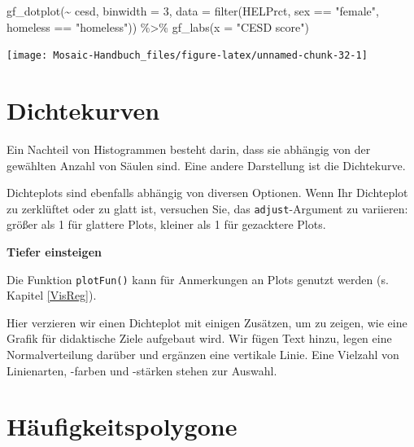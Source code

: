 \documentclass[
  ngerman,
]{scrbook}
\newenvironment{Shaded}{\begin{snugshade}}{\end{snugshade}}
\newcommand{\AttributeTok}[1]{\textcolor[rgb]{0.77,0.63,0.00}{#1}}
\newcommand{\DecValTok}[1]{\textcolor[rgb]{0.00,0.00,0.81}{#1}}
\newcommand{\FunctionTok}[1]{\textcolor[rgb]{0.00,0.00,0.00}{#1}}
\newcommand{\NormalTok}[1]{#1}
\newcommand{\SpecialCharTok}[1]{\textcolor[rgb]{0.00,0.00,0.00}{#1}}
\newcommand{\StringTok}[1]{\textcolor[rgb]{0.31,0.60,0.02}{#1}}
\newenvironment{tiefereinsteigen}[1]
  {
  \begin{itemize}
  \renewcommand{\labelitemi}{
    \raisebox{2.6\height}[0pt][0pt]{
      {\setkeys{Gin}{width=7em,keepaspectratio}
        {\normalsize \textcolor{dark-fom-green}\faSearch}}
        }
  }
  \begin{blackbox}
         \bgroup\color{dark-fom-green}
          {\textbf{Tiefer einsteigen}}
        \egroup
  \item
  }
  {
  \end{blackbox}
  \end{itemize}
  }
\newenvironment{note}[1]
  {
  \begin{itemize}
  \renewcommand{\labelitemi}{
    \raisebox{-.01\height}[0pt][0pt]{
      {\setkeys{Gin}{width=7em,keepaspectratio}
        {\normalsize \textcolor{dark-fom-green}\faHashtag}}
        }
  }
  \begin{blackbox}
   \item
    }
    {
  \end{blackbox}
  \end{itemize}
  }
\begin{document}
\begin{Shaded}
\begin{Highlighting}[]
\FunctionTok{gf\_dotplot}\NormalTok{(}\SpecialCharTok{\textasciitilde{}}\NormalTok{ cesd, }\AttributeTok{binwidth =} \DecValTok{3}\NormalTok{,}
\AttributeTok{data =} \FunctionTok{filter}\NormalTok{(HELPrct, sex }\SpecialCharTok{==} \StringTok{"female"}\NormalTok{, homeless }\SpecialCharTok{==} \StringTok{"homeless"}\NormalTok{)) }\SpecialCharTok{\%\textgreater{}\%}
\FunctionTok{gf\_labs}\NormalTok{(}\AttributeTok{x =} \StringTok{"CESD score"}\NormalTok{)}
\end{Highlighting}
\end{Shaded}

\begin{center}\texttt{[image: Mosaic-Handbuch\_files/figure-latex/unnamed-chunk-32-1]} \end{center}

\hypertarget{dichtekurven}{%
\section{Dichtekurven}\label{dichtekurven}}

Ein Nachteil von Histogrammen besteht darin, dass sie abhängig von der gewählten Anzahl von Säulen sind. Eine andere Darstellung ist die Dichtekurve.

\begin{note}{note}
Dichteplots sind ebenfalls abhängig von diversen Optionen. Wenn Ihr Dichteplot zu zerklüftet oder zu glatt ist, versuchen Sie, das \texttt{adjust}-Argument zu variieren: größer als 1 für glattere Plots, kleiner als 1 für gezacktere Plots.

\end{note}

\begin{tiefereinsteigen}{tiefereinsteigen}
Die Funktion \texttt{plotFun()} kann für Anmerkungen an Plots genutzt werden (s. Kapitel \ref{VisReg}).

\end{tiefereinsteigen}

Hier verzieren wir einen Dichteplot mit einigen Zusätzen, um zu zeigen, wie eine Grafik für didaktische Ziele aufgebaut wird. Wir fügen Text hinzu, legen eine Normalverteilung darüber und ergänzen eine vertikale Linie. Eine Vielzahl von Linienarten, -farben und -stärken stehen zur Auswahl.

\hypertarget{huxe4ufigkeitspolygone}{%
\section{Häufigkeitspolygone}\label{huxe4ufigkeitspolygone}}
\end{document}
